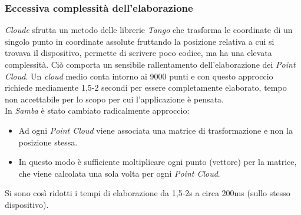 \subsubsection{Eccessiva complessità dell'elaborazione}
\emph{Cloude} sfrutta un metodo delle librerie \emph{Tango} che trasforma le coordinate di un singolo punto in coordinate assolute fruttando la posizione relativa a cui si trovava il dispositivo, permette di scrivere poco codice, ma ha una elevata complessità. Ciò comporta un sensibile rallentamento dell'elaborazione dei \emph{Point Cloud}. Un \emph{cloud} medio conta intorno ai 9000 punti e con questo approccio richiede mediamente 1,5-2 secondi per essere completamente elaborato, tempo non accettabile per lo scopo per cui l'applicazione è pensata.\\
In \emph{Samba} è stato cambiato radicalmente approccio:
\begin{itemize}
	\item Ad ogni \emph{Point Cloud} viene associata una matrice di trasformazione e non la posizione stessa.
	\item In questo modo è sufficiente moltiplicare ogni punto (vettore) per la matrice, che viene calcolata una sola volta per ogni \emph{Point Cloud}. 
\end{itemize}
Si sono così ridotti i tempi di elaborazione da 1,5-2s a circa 200ms (sullo stesso dispositivo).
